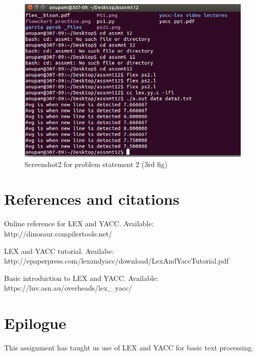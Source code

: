 \documentclass[12pt]{article}
\begin{document}
\newpage

\begin{figure}[h]
\includegraphics[scale=0.65]{ps23.png}
\caption{Screenshot2 for problem statement 2 (3rd fig)}
\end{figure}




\newpage

\section{References and citations}
\begin{thebibliography}{3} 

Online reference for LEX and YACC. Available: http://dinosaur.compilertools.net/

LEX and YACC tutorial. Availabe: http://epaperpress.com/lexandyacc/download/LexAndYaccTutorial.pdf


Basic introduction to LEX and YACC. Available: https://luv.asn.au/overheads/lex\_ yacc/



 
\end{thebibliography}



\newpage
\section{\textbf{Epilogue}}
This assignment has taught us use of LEX and YACC for basic text processing.
\end{document}
